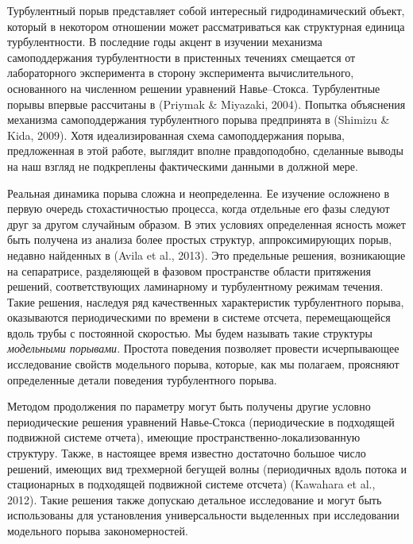 Турбулентный порыв представляет собой интересный гидродинамический объект, который в некотором отношении может рассматриваться как структурная единица турбулентности. %
В последние годы акцент в изучении механизма самоподдержания турбулентности в пристенных течениях смещается от лабораторного эксперимента в сторону эксперимента вычислительного, основанного на численном решении уравнений Навье--Стокса. Турбулентные порывы впервые рассчитаны в (Priymak \& Miyazaki, 2004).
Попытка объяснения механизма самоподдержания турбулентного порыва предпринята в (Shimizu \& Kida, 2009). Хотя идеализированная схема самоподдержания порыва, предложенная в этой работе, выглядит вполне правдоподобно, сделанные выводы на наш взгляд не подкреплены фактическими данными в должной мере. 

Реальная динамика порыва сложна и неопределенна. Ее изучение осложнено в первую очередь стохастичностью процесса, когда отдельные его фазы следуют друг за другом случайным образом. В этих условиях определенная ясность может быть получена из анализа более простых структур, аппроксимирующих порыв, недавно найденных в (Avila et al., 2013). Это предельные решения, возникающие на сепаратрисе, разделяющей в фазовом пространстве области притяжения решений, соответствующих ламинарному и турбулентному режимам течения. Такие решения, наследуя ряд качественных характеристик турбулентного порыва, оказываются периодическими по времени в системе отсчета, перемещающейся вдоль трубы с постоянной скоростью. Мы будем называть такие структуры {\it модельными порывами}. Простота поведения позволяет провести исчерпывающее исследование свойств модельного порыва, которые, как мы полагаем, проясняют определенные детали поведения турбулентного порыва. 

Методом продолжения по параметру могут быть получены другие условно периодические решения уравнений Навье-Стокса (периодические в подходящей подвижной системе отчета), имеющие пространственно-локализованную структуру. Также, в настоящее время известно достаточно большое число решений, имеющих вид трехмерной бегущей волны (периодичных вдоль потока и стационарных в подходящей подвижной системе отсчета) (Kawahara et al., 2012). Такие решения также допускаю детальное исследование и могут быть использованы для установления универсальности выделенных при исследовании модельного порыва закономерностей. 

